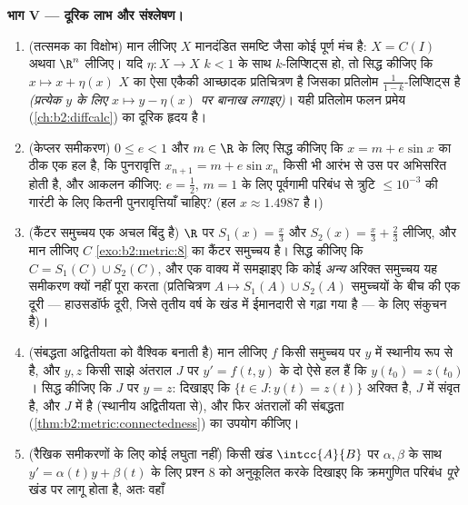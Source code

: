 \begin{problem}[{सप्ताहांत समस्या --- पिकार--लिंडलोफ़
प्रमेय}]
\medskip
\noindent\textbf{भाग V --- दूरिक लाभ और संश्लेषण।}
\begin{enumerate}[resume]
  \item (तत्समक का विक्षोभ) मान लीजिए $X$ मानदंडित समष्टि जैसा कोई
        पूर्ण मंच है: $X = C(I)$ अथवा $\R^n$ लीजिए। यदि $\eta \colon X \to X$ $k < 1$ के साथ
        $k$-लिप्शिट्स हो, तो सिद्ध कीजिए कि $x \mapsto x + \eta(x)$ $X$ का ऐसा एकैकी
        आच्छादक प्रतिचित्रण है जिसका प्रतिलोम $\frac1{1-k}$-लिप्शिट्स है
        \emph{(प्रत्येक $y$ के लिए $x \mapsto y - \eta(x)$ पर बानाख लगाइए)}। यही
        प्रतिलोम फलन प्रमेय (\cref{ch:b2:diffcalc}) का दूरिक हृदय है।
  \item (केप्लर समीकरण) $0 \leq e < 1$ और $m \in \R$ के लिए सिद्ध कीजिए कि $x = m + e\sin x$ का ठीक
        एक हल है, कि पुनरावृत्ति $x_{n+1} = m + e\sin x_n$ किसी भी आरंभ से उस पर अभिसरित
        होती है, और आकलन कीजिए: $e = \frac12$, $m = 1$ के लिए पूर्वगामी परिबंध से
        त्रुटि $\leq
        10^{-3}$ की गारंटी के लिए कितनी पुनरावृत्तियाँ चाहिए? (हल
        $x
        \approx 1.4987$ है।)
  \item (कैंटर समुच्चय एक अचल बिंदु है) $\R$ पर $S_1(x) = \frac
        x3$ और $S_2(x) = \frac x3 + \frac23$ लीजिए,
        और मान लीजिए $C$ \cref{exo:b2:metric:8} का कैंटर समुच्चय है। सिद्ध कीजिए कि
        $C = S_1(C) \cup S_2(C)$, और एक वाक्य में समझाइए कि कोई \emph{अन्य} अरिक्त 
        समुच्चय यह समीकरण क्यों नहीं पूरा करता (प्रतिचित्रण $A \mapsto S_1(A) \cup S_2(A)$ 
        समुच्चयों के बीच की एक दूरी --- हाउसडॉर्फ दूरी, जिसे तृतीय वर्ष
        के खंड में ईमानदारी से गढ़ा गया है --- के लिए संकुचन है)।
  \item (संबद्धता अद्वितीयता को वैश्विक बनाती है) मान लीजिए $f$ किसी
         समुच्चय पर $y$ में स्थानीय रूप से  है, और $y, z$
        किसी साझे अंतराल $J$ पर $y' = f(t, y)$ के दो ऐसे हल हैं कि $y(t_0) = z(t_0)$। सिद्ध
        कीजिए कि $J$ पर $y = z$: दिखाइए कि $\{t \in J : y(t) = z(t)\}$ अरिक्त है, $J$ में
        संवृत है, और $J$ में  है (स्थानीय अद्वितीयता से), और फिर
        अंतरालों की संबद्धता (\cref{thm:b2:metric:connectedness}) का उपयोग कीजिए।
  \item (रैखिक समीकरणों के लिए कोई लघुता नहीं) किसी खंड $\intcc{A}{B}$ पर 
        $\alpha, \beta$ के साथ $y' =
        \alpha(t)y + \beta(t)$ के लिए प्रश्न 8 को अनुकूलित करके दिखाइए कि
        क्रमगुणित परिबंध \emph{पूरे} खंड पर लागू होता है, अतः वहाँ

\end{enumerate}
\end{problem}

